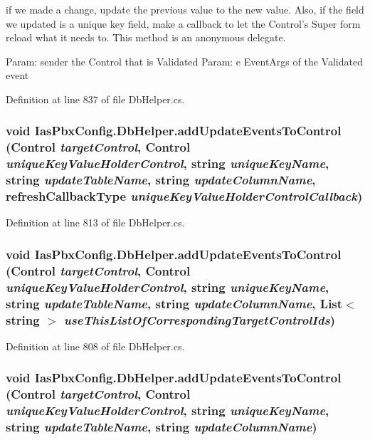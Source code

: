 if we made a change, update the previous value to the new value. Also, if the field we updated is a unique key field, make a callback to let the Control's Super form reload what it needs to. This method is an anonymous delegate.

Param: sender the Control that is Validated Param: e EventArgs of the Validated event 

Definition at line 837 of file DbHelper.cs.\hypertarget{class_ias_pbx_config_1_1_db_helper_ac588d2d2d428389c00a882b2b36fac52}{
\subsubsection[{addUpdateEventsToControl}]{\setlength{\rightskip}{0pt plus 5cm}void IasPbxConfig.DbHelper.addUpdateEventsToControl (Control {\em targetControl}, \/  Control {\em uniqueKeyValueHolderControl}, \/  string {\em uniqueKeyName}, \/  string {\em updateTableName}, \/  string {\em updateColumnName}, \/  refreshCallbackType {\em uniqueKeyValueHolderControlCallback})}}
\label{class_ias_pbx_config_1_1_db_helper_ac588d2d2d428389c00a882b2b36fac52}


Definition at line 813 of file DbHelper.cs.\hypertarget{class_ias_pbx_config_1_1_db_helper_a24581849a3366fdb2b017501e7dc62ce}{
\subsubsection[{addUpdateEventsToControl}]{\setlength{\rightskip}{0pt plus 5cm}void IasPbxConfig.DbHelper.addUpdateEventsToControl (Control {\em targetControl}, \/  Control {\em uniqueKeyValueHolderControl}, \/  string {\em uniqueKeyName}, \/  string {\em updateTableName}, \/  string {\em updateColumnName}, \/  List$<$ string $>$ {\em useThisListOfCorrespondingTargetControlIds})}}
\label{class_ias_pbx_config_1_1_db_helper_a24581849a3366fdb2b017501e7dc62ce}


Definition at line 808 of file DbHelper.cs.\hypertarget{class_ias_pbx_config_1_1_db_helper_a08bf253f903973562550f24d9fb3308a}{
\subsubsection[{addUpdateEventsToControl}]{\setlength{\rightskip}{0pt plus 5cm}void IasPbxConfig.DbHelper.addUpdateEventsToControl (Control {\em targetControl}, \/  Control {\em uniqueKeyValueHolderControl}, \/  string {\em uniqueKeyName}, \/  string {\em updateTableName}, \/  string {\em updateColumnName})}}
\label{class_ias_pbx_config_1_1_db_helper_a08bf253f903973562550f24d9fb3308a}


